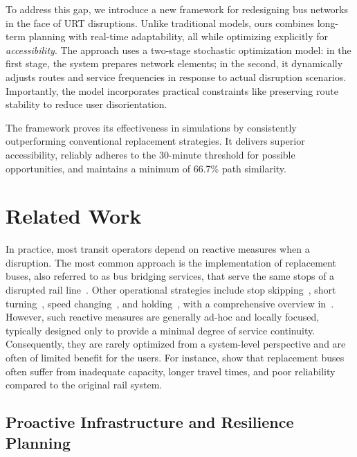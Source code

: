 \documentclass[3p,times,procedia]{elsarticle}
\begin{document}
To address this gap, we introduce a new framework for redesigning bus networks in the face of URT disruptions. Unlike traditional models, ours combines long-term planning with real-time adaptability, all while optimizing explicitly for \emph{accessibility}. The approach uses a two-stage stochastic optimization model: in the first stage, the system prepares network elements; in the second, it dynamically adjusts routes and service frequencies in response to actual disruption scenarios. Importantly, the model incorporates practical constraints like preserving route stability to reduce user disorientation.

The framework proves its effectiveness in simulations by consistently outperforming conventional replacement strategies. It delivers superior accessibility, reliably adheres to the 30-minute threshold for possible opportunities, and maintains a minimum of 66.7\% path similarity.

\section{Related Work}\label{sec:relatedWork}

In practice, most transit operators depend on reactive measures when a disruption. The most common approach is the implementation of replacement buses, also referred to as bus bridging services, that serve the same stops of a disrupted rail line~\citep{Pender2012,CurrieMuir2017}. Other operational strategies include stop skipping~\citep{Tang2018}, short turning~\citep{Peled2021}, speed changing~\citep{Manasra2019}, and holding~\citep{Olvera2023}, with a comprehensive overview in~\citep{Gkiotsalitis2022}.
%
However, such reactive measures are generally ad-hoc and locally focused, typically designed only to provide a minimal degree of service continuity. 
Consequently, they are rarely optimized from a system-level perspective and are often of limited benefit for the users. 
For instance, \citet{CurrieMuir2017} show that replacement buses often suffer from inadequate capacity, longer travel times, and poor reliability compared to the original rail system.

\subsection{Proactive Infrastructure and Resilience Planning}\label{subsec:proactive}
\end{document}
